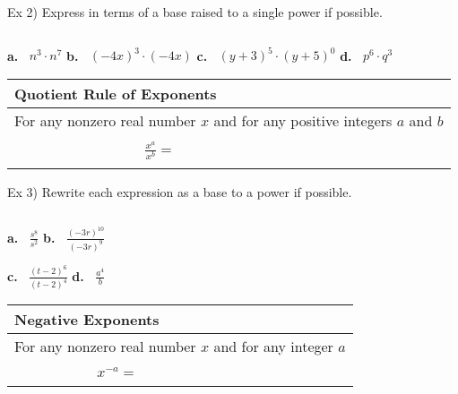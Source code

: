 \documentclass{ximera}
\begin{document}
\noindent Ex 2) Express in terms of a base raised to a single power if possible.

$~$

\textbf{a.}$~~~~$$\displaystyle n^3 \cdot n^7$\hspace{1in} \textbf{b.}$~~~~$$\displaystyle (-4x)^3 \cdot (-4x)$\hspace{1in}
\textbf{c.}$~~~~$$\displaystyle (y+3)^5 \cdot (y+5)^0$\hspace{1in} \textbf{d.}$~~~~$$\displaystyle p^6 \cdot q^3$

\vspace{.5in}

\begin{center} \begin{tabular}{|l|}
\hline 
Quotient Rule of Exponents\\
\hline
For any nonzero real number $x$ and for any positive integers $a$ and $b$\\
$~$\\
$~~~~~~~~~~~~~~~~~~~~~~~~~~~~~~~~~~~~~~~~~${\Large$\displaystyle \frac{x^a}{x^b}=~~~~$}\\
$~$\\
\hline
\end{tabular} \end{center}

\noindent Ex 3) Rewrite each expression as a base to a power if possible.

$~$

\textbf{a.}$~~~~$$\displaystyle \frac{s^8}{s^2}$\hspace{2in} \textbf{b.}$~~~~$$\displaystyle \frac{(-3r)^{10}}{(-3r)^9}$

\vspace{.5in}

\hspace{1in}\textbf{c.}$~~~~$$\displaystyle \frac{(t-2)^6}{(t-2)^4}  $\hspace{2in} \textbf{d.}$~~~~$$\displaystyle \frac{a^4}{b}$


\pagebreak

\begin{center} \begin{tabular}{|l|}
\hline 
Negative Exponents\\
\hline
For any nonzero real number $x$ and for any integer $a$\\
$~$\\
$~~~~~~~~~~~~~~~~~~~~~~~~~~${\Large$\displaystyle x^{-a} = $}\\
$~$\\
\hline
\end{tabular} \end{center}
\end{document}
